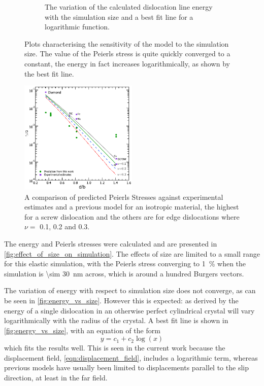 \begin{figure}
\begin{subfigure}{0.4\textwidth}
\caption{The variation of the calculated dislocation line energy with the simulation size and a best fit line for a logarithmic function.\label{fig:energy_vs_size}}
\end{subfigure}
\caption[The effect of simulation size on dislocation energy and Peierls stress.]{Plots characterising the sensitivity of the model to the simulation size. The value of the Peierls stress is quite quickly converged to a constant, the energy in fact increases logarithmically, as shown by the best fit line.\label{fig:effect_of_size_on_simulation}}
\end{figure}

\begin{figure}
\centering
\includegraphics[width=0.5\textwidth]{tp_G_vs_d_b}
\caption[A comparison of predicted Peierls Stresses against previous estimates.]{A comparison of predicted Peierls Stresses against experimental estimates \cite{Wang1996} and a previous model \cite{Clegg2006} for an isotropic material, the highest for a screw dislocation and the others are for edge dislocations where $\nu=$ 0.1, 0.2 and 0.3. \label{fig:tp_vs_d_b}}
\end{figure}


The energy and Peierls stresses were calculated and are presented in \autoref{fig:effect_of_size_on_simulation}. The effects of size are limited to a small range for this elastic simulation, with the Peierls stress converging to \SI{1}{\percent} when the simulation is  \SI{\sim 30}{\nano\meter} across, which is around a hundred Burgers vectors.

The variation of energy with respect to simulation size does not converge, as can be seen in \autoref{fig:energy_vs_size}. However this is expected: as derived by \citet{Nabarro1947} the energy of a single dislocation in an otherwise perfect cylindrical crystal will vary logarithmically with the radius of the crystal. A best fit line is shown in \autoref{fig:energy_vs_size}, with an equation of the form
\begin{equation}
y = c_1 + c_2 \log \left( x \right)
\end{equation}
which fits the results well. This is seen in the current work because the displacement field, \ref{eqn:displacement_field},  includes a logarithmic term, whereas previous models have usually been limited to displacements parallel to the slip direction, at least in the far field.



